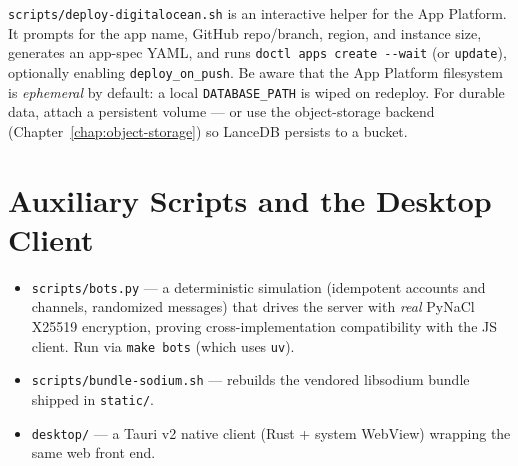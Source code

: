 \verb|scripts/deploy-digitalocean.sh| is an interactive helper for the App
Platform. It prompts for the app name, GitHub repo/branch, region, and instance
size, generates an app-spec YAML, and runs \verb|doctl apps create --wait| (or
\verb|update|), optionally enabling \verb|deploy_on_push|. Be aware that the App
Platform filesystem is \emph{ephemeral} by default: a local
\verb|DATABASE_PATH| is wiped on redeploy. For durable data, attach a persistent
volume --- or use the object-storage backend
(Chapter~\ref{chap:object-storage}) so LanceDB persists to a bucket.

\section{Auxiliary Scripts and the Desktop Client}

\begin{itemize}
  \item \verb|scripts/bots.py| --- a deterministic simulation (idempotent
        accounts and channels, randomized messages) that drives the server with
        \emph{real} PyNaCl X25519 encryption, proving cross-implementation
        compatibility with the JS client. Run via \verb|make bots| (which uses
        \verb|uv|).
  \item \verb|scripts/bundle-sodium.sh| --- rebuilds the vendored libsodium
        bundle shipped in \verb|static/|.
  \item \verb|desktop/| --- a Tauri v2 native client (Rust + system WebView)
        wrapping the same web front end.
\end{itemize}
